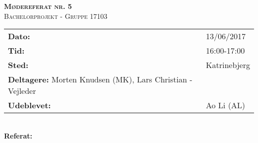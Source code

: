 
\newcommand{\HRule}{\rule{\linewidth}{0.1mm}}


	\begin{center}
		{\huge \bfseries \textsc{Mødereferat nr. 5}}\\
		\textsc{\large Bachelorprojekt - Gruppe 17103}\\[0.3cm]
	\end{center}
	\begin{tabular}{ll}
	\large \textbf{Dato:} & 13/06/2017  	\\ %
	\large \textbf{Tid:}  & 16:00-17:00 	\\ %
	\large \textbf{Sted:} & Katrinebjerg		\\ %
	\large \textbf{Deltagere:} Morten Knudsen (MK), Lars Christian - Vejleder \\
	\large \textbf{Udeblevet:} & Ao Li (AL)
	\end{tabular}\\
	\phantom{\,}\hspace{0.1em} \large \textbf{Referat:}
